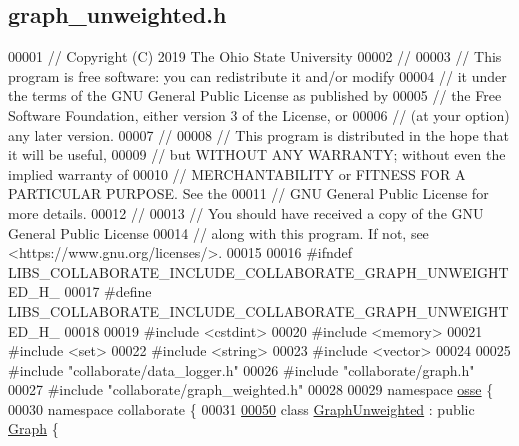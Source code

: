 \hypertarget{graph__unweighted_8h_source}{}\subsection{graph\+\_\+unweighted.\+h}
\label{graph__unweighted_8h_source}

\begin{DoxyCode}
00001 \textcolor{comment}{// Copyright (C) 2019 The Ohio State University}
00002 \textcolor{comment}{//}
00003 \textcolor{comment}{// This program is free software: you can redistribute it and/or modify}
00004 \textcolor{comment}{// it under the terms of the GNU General Public License as published by}
00005 \textcolor{comment}{// the Free Software Foundation, either version 3 of the License, or}
00006 \textcolor{comment}{// (at your option) any later version.}
00007 \textcolor{comment}{//}
00008 \textcolor{comment}{// This program is distributed in the hope that it will be useful,}
00009 \textcolor{comment}{// but WITHOUT ANY WARRANTY; without even the implied warranty of}
00010 \textcolor{comment}{// MERCHANTABILITY or FITNESS FOR A PARTICULAR PURPOSE.  See the}
00011 \textcolor{comment}{// GNU General Public License for more details.}
00012 \textcolor{comment}{//}
00013 \textcolor{comment}{// You should have received a copy of the GNU General Public License}
00014 \textcolor{comment}{// along with this program.  If not, see <https://www.gnu.org/licenses/>.}
00015 
00016 \textcolor{preprocessor}{#ifndef LIBS\_COLLABORATE\_INCLUDE\_COLLABORATE\_GRAPH\_UNWEIGHTED\_H\_}
00017 \textcolor{preprocessor}{#define LIBS\_COLLABORATE\_INCLUDE\_COLLABORATE\_GRAPH\_UNWEIGHTED\_H\_}
00018 
00019 \textcolor{preprocessor}{#include <cstdint>}
00020 \textcolor{preprocessor}{#include <memory>}
00021 \textcolor{preprocessor}{#include <set>}
00022 \textcolor{preprocessor}{#include <string>}
00023 \textcolor{preprocessor}{#include <vector>}
00024 
00025 \textcolor{preprocessor}{#include "collaborate/data\_logger.h"}
00026 \textcolor{preprocessor}{#include "collaborate/graph.h"}
00027 \textcolor{preprocessor}{#include "collaborate/graph\_weighted.h"}
00028 
00029 \textcolor{keyword}{namespace }\hyperlink{namespaceosse}{osse} \{
00030 \textcolor{keyword}{namespace }collaborate \{
00031 
\hyperlink{classosse_1_1collaborate_1_1_graph_unweighted}{00050} \textcolor{keyword}{class }\hyperlink{classosse_1_1collaborate_1_1_graph_unweighted}{GraphUnweighted} : \textcolor{keyword}{public} \hyperlink{classosse_1_1collaborate_1_1_graph}{Graph} \{

\end{DoxyCode}
